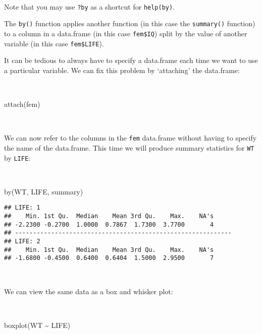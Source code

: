 \documentclass[
  12pt,
  a4paper]{book}
\newenvironment{Shaded}{\begin{snugshade}}{\end{snugshade}}
\newcommand{\FunctionTok}[1]{\textcolor[rgb]{0.00,0.00,0.00}{#1}}
\newcommand{\NormalTok}[1]{#1}
\newcommand{\SpecialCharTok}[1]{\textcolor[rgb]{0.00,0.00,0.00}{#1}}
\begin{document}
~

Note that you may use \texttt{?by} as a shortcut for \texttt{help(by)}.

The \texttt{by()} function applies another function (in this case the \texttt{summary()} function) to a column in a
data.frame (in this case \texttt{fem\$IQ}) split by the value of another variable (in this case \texttt{fem\$LIFE}).

It can be tedious to always have to specify a data.frame each time we want to use a particular variable. We can
fix this problem by `attaching' the data.frame:

~

\begin{Shaded}
\begin{Highlighting}[]
\FunctionTok{attach}\NormalTok{(fem)}
\end{Highlighting}
\end{Shaded}

~

We can now refer to the columns in the \texttt{fem} data.frame without having to specify the name of the data.frame. This time we will produce summary statistics for \texttt{WT} by \texttt{LIFE}:

~

\begin{Shaded}
\begin{Highlighting}[]
\FunctionTok{by}\NormalTok{(WT, LIFE, summary)}
\end{Highlighting}
\end{Shaded}

\begin{verbatim}
## LIFE: 1
##    Min. 1st Qu.  Median    Mean 3rd Qu.    Max.    NA's 
## -2.2300 -0.2700  1.0000  0.7867  1.7300  3.7700       4 
## ------------------------------------------------------------ 
## LIFE: 2
##    Min. 1st Qu.  Median    Mean 3rd Qu.    Max.    NA's 
## -1.6800 -0.4500  0.6400  0.6404  1.5000  2.9500       7
\end{verbatim}

~

We can view the same data as a box and whisker plot:

~

\begin{Shaded}
\begin{Highlighting}[]
\FunctionTok{boxplot}\NormalTok{(WT }\SpecialCharTok{\textasciitilde{}}\NormalTok{ LIFE)}
\end{Highlighting}
\end{Shaded}
\end{document}
